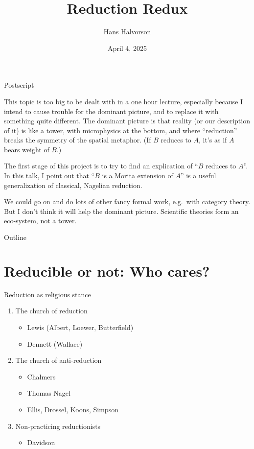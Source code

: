 \documentclass[fleqn]{beamer}
\title{Reduction Redux}
\subtitle{}
\author{Hans Halvorson}
\institute{Princeton University}
\date{April 4, 2025}
\begin{document}
\begin{frame}
  \titlepage
\end{frame}

\begin{frame}{Postscript}

  \small 

  This topic is too big to be dealt with in a one hour lecture,
  especially because I intend to cause trouble for the dominant
  picture, and to replace it with something quite different. The
  dominant picture is that reality (or our description of it) is like
  a tower, with microphysics at the bottom, and where ``reduction''
  breaks the symmetry of the spatial metaphor. (If $B$ reduces to $A$,
  it's as if $A$ bears weight of $B$.)

  The first stage of this project is to try to find an explication of
  ``$B$ reduces to $A$''. In this talk, I point out that ``$B$ is a
  Morita extension of $A$'' is a useful generalization of classical,
  Nagelian reduction.

  We could go on and do lots of other fancy formal work, e.g.\ with
  category theory. But I don't think it will help the dominant
  picture. Scientific theories form an eco-system, not a tower.
  
\end{frame}

\begin{frame}{Outline}
  \tableofcontents
\end{frame}




\section{Reducible or not: Who cares?}

\begin{frame}{Reduction as religious stance}

  \begin{enumerate}
  \item The church of reduction
    \begin{itemize}
    \item Lewis (Albert, Loewer, Butterfield)
    \item Dennett (Wallace)
    \end{itemize}
  \item The church of anti-reduction
    \begin{itemize}
    \item Chalmers
    \item Thomas Nagel  
    \item Ellis, Drossel, Koons, Simpson
    \end{itemize}
  \item Non-practicing reductionists
    \begin{itemize}
    \item Davidson 
    \end{itemize}
  \end{enumerate}

\end{frame}
\end{document}
